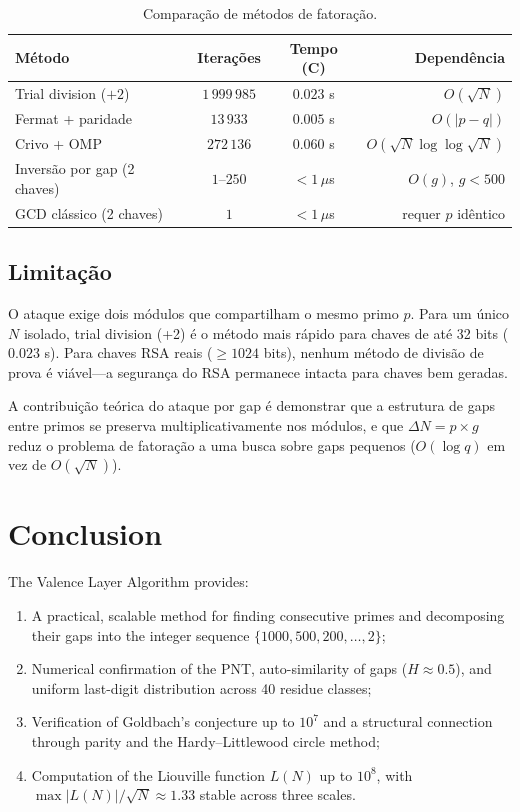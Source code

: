 \documentclass[12pt,a4paper]{article}
\theoremstyle{plain}
\begin{document}
\begin{table}[htbp]
\centering
\caption{Comparação de métodos de fatoração.}
\label{tab:metodos_comp}
\begin{tabular}{lccr}
\hline
Método & Iterações & Tempo (C) & Dependência \\
\hline
Trial division ($+2$) & $1\,999\,985$ & $0.023$ s & $O(\sqrt{N})$ \\
Fermat + paridade & $13\,933$ & $0.005$ s & $O(|p-q|)$ \\
Crivo + OMP & $272\,136$ & $0.060$ s & $O(\sqrt{N}\log\log\sqrt{N})$ \\
Inversão por gap (2 chaves) & $1$--$250$ & $< 1\,\mu$s & $O(g)$, $g < 500$ \\
GCD clássico (2 chaves) & $1$ & $< 1\,\mu$s & requer $p$ idêntico \\
\hline
\end{tabular}
\end{table}

\subsection{Limitação}

O ataque exige dois módulos que compartilham o mesmo primo $p$.
Para um único $N$ isolado, trial division (+2) é o método mais
rápido para chaves de até 32 bits ($0.023$ s).  Para chaves
RSA reais ($\ge 1024$ bits), nenhum método de divisão de prova
é viável---a segurança do RSA permanece intacta para chaves
bem geradas.

A contribuição teórica do ataque por gap é demonstrar que
a estrutura de gaps entre primos se preserva multiplicativamente
nos módulos, e que $\Delta N = p \times g$ reduz o problema de
fatoração a uma busca sobre gaps pequenos ($O(\log q)$ em vez
de $O(\sqrt{N})$).

\section{Conclusion}

The Valence Layer Algorithm provides:
\begin{enumerate}
  \item A practical, scalable method for finding consecutive primes
    and decomposing their gaps into the integer sequence
    $\{1000,500,200,\dots,2\}$;
  \item Numerical confirmation of the PNT, auto-similarity of gaps
    ($H\approx0.5$), and uniform last-digit distribution across
    40 residue classes;
  \item Verification of Goldbach's conjecture up to $10^7$ and
    a structural connection through parity and the Hardy--Littlewood
    circle method;
  \item Computation of the Liouville function $L(N)$ up to $10^{8}$,
    with $\max|L(N)|/\sqrt{N}\approx1.33$ stable across three scales.
\end{enumerate}
\end{document}
